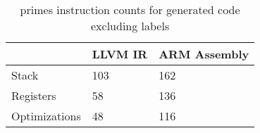 \begin{table}[h!]
\centering
\begin{tabular}{p{}p{}p{}}
  \hline
 & LLVM IR & ARM Assembly \\ 
  \hline
Stack & 103 & 162 \\ 
  Registers &  58 & 136 \\ 
  Optimizations &  48 & 116 \\ 
   \hline
\end{tabular}
\caption{primes instruction counts for generated code excluding labels}
\end{table}
